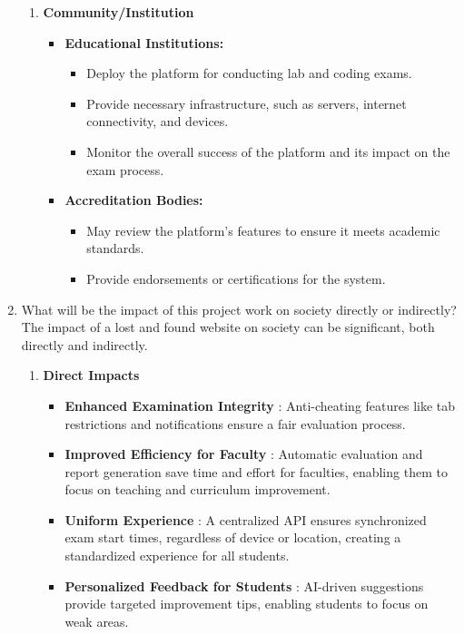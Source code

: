 \documentclass[14pt]{article}
\begin{document}
\begin{enumerate}
\begin{enumerate}
    \item \textbf{Community/Institution}
    \begin{itemize}
        \item \textbf{Educational Institutions:}
        \begin{itemize}
            \item Deploy the platform for conducting lab and coding exams.
            \item Provide necessary infrastructure, such as servers, internet connectivity, and devices.
            \item Monitor the overall success of the platform and its impact on the exam process.
        \end{itemize}
        \item \textbf{Accreditation Bodies:}
        \begin{itemize}
            \item May review the platform’s features to ensure it meets academic standards.
            \item Provide endorsements or certifications for the system.
        \end{itemize}
    \end{itemize}
\end{enumerate}
\item What will be the impact of this project work on society directly or indirectly?\\
\tabto{.5cm}The impact of a lost and found website on society can be significant, both directly
and indirectly.
\begin{enumerate}
\item \textbf{Direct Impacts}
\begin{itemize}
\item \textbf{Enhanced Examination Integrity} : Anti-cheating features like tab restrictions and notifications ensure a fair evaluation process.
\item \textbf{Improved Efficiency for Faculty} : Automatic evaluation and report generation save time and effort for faculties, enabling them to focus on teaching and curriculum improvement.
\item \textbf{Uniform Experience} : A centralized API ensures synchronized exam start times, regardless of device or location, creating a standardized experience for all students.
\item \textbf{Personalized Feedback for Students} : AI-driven suggestions provide targeted improvement tips, enabling students to focus on weak areas.

\end{itemize}
\end{enumerate}
\end{enumerate}
\end{document}
